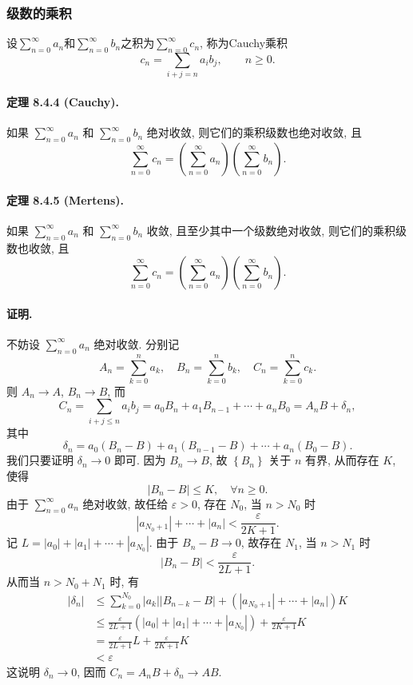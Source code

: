\subsubsection{级数的乘积}

设$\sum_{n=0}^{\infty}a_{n}$和$\sum_{n=0}^{\infty}b_{n}$之积为$\sum_{n=0}^{\infty}c_{n}$,
称为Cauchy乘积
\[
c_{n}=\sum_{i+j=n}a_{i}b_{j},\qquad n\ge0.
\]


\paragraph{定理 8.4.4 (Cauchy). }

如果 $\sum_{n=0}^{\infty}a_{n}$ 和 $\sum_{n=0}^{\infty}b_{n}$ 绝对收敛,
则它们的乘积级数也绝对收敛, 且 
\[
\sum_{n=0}^{\infty}c_{n}=\left(\sum_{n=0}^{\infty}a_{n}\right)\left(\sum_{n=0}^{\infty}b_{n}\right).
\]


\paragraph{定理 8.4.5 (Mertens). }

如果 $\sum_{n=0}^{\infty}a_{n}$ 和 $\sum_{n=0}^{\infty}b_{n}$ 收敛, 且至少其中一个级数绝对收敛,
则它们的乘积级数也收敛, 且 
\[
\sum_{n=0}^{\infty}c_{n}=\left(\sum_{n=0}^{\infty}a_{n}\right)\left(\sum_{n=0}^{\infty}b_{n}\right).
\]


\paragraph{证明. }

不妨设 $\sum_{n=0}^{\infty}a_{n}$ 绝对收敛. 分别记 
\[
A_{n}=\sum_{k=0}^{n}a_{k},\quad B_{n}=\sum_{k=0}^{n}b_{k},\quad C_{n}=\sum_{k=0}^{n}c_{k}.
\]
则 $A_{n}\rightarrow A$, $B_{n}\rightarrow B$, 而 
\[
C_{n}=\sum_{i+j\leqslant n}a_{i}b_{j}=a_{0}B_{n}+a_{1}B_{n-1}+\cdots+a_{n}B_{0}=A_{n}B+\delta_{n},
\]
其中 
\[
\delta_{n}=a_{0}\left(B_{n}-B\right)+a_{1}\left(B_{n-1}-B\right)+\cdots+a_{n}\left(B_{0}-B\right).
\]
我们只要证明 $\delta_{n}\rightarrow0$ 即可. 因为 $B_{n}\rightarrow B$, 故 $\left\{ B_{n}\right\} $
关于 $n$ 有界, 从而存在 $K$, 使得 
\[
\left|B_{n}-B\right|\leqslant K,\quad\forall n\geqslant0.
\]
由于 $\sum_{n=0}^{\infty}a_{n}$ 绝对收敛, 故任给 $\varepsilon>0$, 存在 $N_{0}$,
当 $n>N_{0}$ 时 
\[
\left|a_{N_{0}+1}\right|+\cdots+\left|a_{n}\right|<\frac{\varepsilon}{2K+1}.
\]
记 $L=\left|a_{0}\right|+\left|a_{1}\right|+\cdots+\left|a_{N_{0}}\right|$.
由于 $B_{n}-B\rightarrow0$, 故存在 $N_{1}$, 当 $n>N_{1}$ 时 
\[
\left|B_{n}-B\right|<\frac{\varepsilon}{2L+1}.
\]
从而当 $n>N_{0}+N_{1}$ 时, 有 
\[
\begin{aligned}\left|\delta_{n}\right| & \leqslant\sum_{k=0}^{N_{0}}\left|a_{k}\right|\left|B_{n-k}-B\right|+\left(\left|a_{N_{0}+1}\right|+\cdots+\left|a_{n}\right|\right)K\\
 & \leqslant\frac{\varepsilon}{2L+1}\left(\left|a_{0}\right|+\left|a_{1}\right|+\cdots+\left|a_{N_{0}}\right|\right)+\frac{\varepsilon}{2K+1}K\\
 & =\frac{\varepsilon}{2L+1}L+\frac{\varepsilon}{2K+1}K\\
 & <\varepsilon
\end{aligned}
\]
这说明 $\delta_{n}\rightarrow0$, 因而 $C_{n}=A_{n}B+\delta_{n}\rightarrow AB$.

